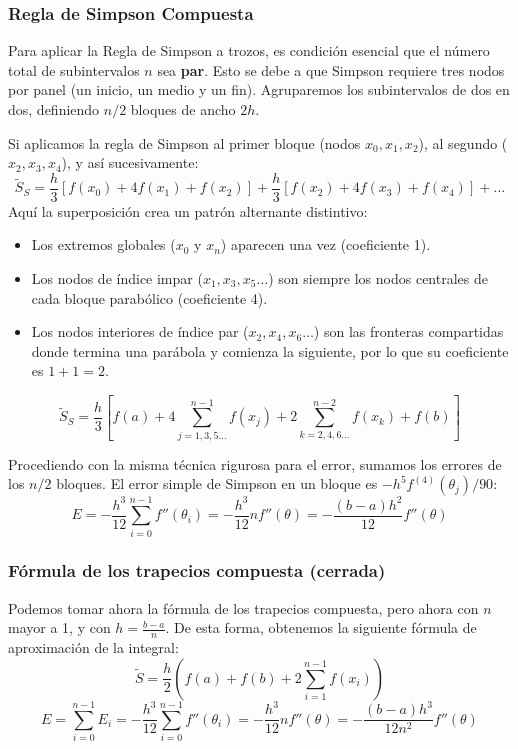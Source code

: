 \subsubsection{Regla de Simpson Compuesta}

Para aplicar la Regla de Simpson a trozos, es condición esencial que el número total de subintervalos $n$ sea \textbf{par}. Esto se debe a que Simpson requiere tres nodos por panel (un inicio, un medio y un fin). Agruparemos los subintervalos de dos en dos, definiendo $n/2$ bloques de ancho $2h$.

Si aplicamos la regla de Simpson al primer bloque (nodos $x_0, x_1, x_2$), al segundo ($x_2, x_3, x_4$), y así sucesivamente:
\[
    \widetilde{S}_S = \frac{h}{3} [f(x_0) + 4f(x_1) + f(x_2)] + \frac{h}{3} [f(x_2) + 4f(x_3) + f(x_4)] + \dots
\]
Aquí la superposición crea un patrón alternante distintivo:
\begin{itemize}
    \item Los extremos globales ($x_0$ y $x_n$) aparecen una vez (coeficiente 1).
    \item Los nodos de índice impar ($x_1, x_3, x_5\dots$) son siempre los nodos centrales de cada bloque parabólico (coeficiente 4).
    \item Los nodos interiores de índice par ($x_2, x_4, x_6\dots$) son las fronteras compartidas donde termina una parábola y comienza la siguiente, por lo que su coeficiente es $1 + 1 = 2$.
\end{itemize}
\[
    \boxed{\widetilde{S}_S = \frac{h}{3} \left[ f(a) + 4 \sum_{j=1, 3, 5\dots}^{n-1} f(x_j) + 2 \sum_{k=2, 4, 6\dots}^{n-2} f(x_k) + f(b) \right]}
\]

Procediendo con la misma técnica rigurosa para el error, sumamos los errores de los $n/2$ bloques. El error simple de Simpson en un bloque es $-h^5 f^{(4)}(\theta_j) / 90$:
\[
    E = -\frac{h^3}{12} \sum_{i=0}^{n-1} f''(\theta_i)
    = -\frac{h^3}{12} n f''(\theta)
    = -\frac{(b-a)h^2}{12}f''(\theta)
\]

\subsubsection{Fórmula de los trapecios compuesta (cerrada)}

Podemos tomar ahora la fórmula de los trapecios compuesta, pero ahora con $n$ mayor a 1, y con $h = \frac{b - a}{n}$. De esta forma, obtenemos la siguiente fórmula de aproximación de la integral:
\[
    \widetilde{S} = \frac{h}{2} (f(a) + f(b) + 2 \sum_{i=1}^{n-1} f(x_i))
\]
\[
    E = \sum_{i=0}^{n-1} E_i =
    -\frac{h^3}{12} \sum_{i=0}^{n-1} f''(\theta_i) =
    -\frac{h^3}{12} n f''(\theta) =
    -\frac{(b-a)h^3}{12n^2}f''(\theta)
\]

